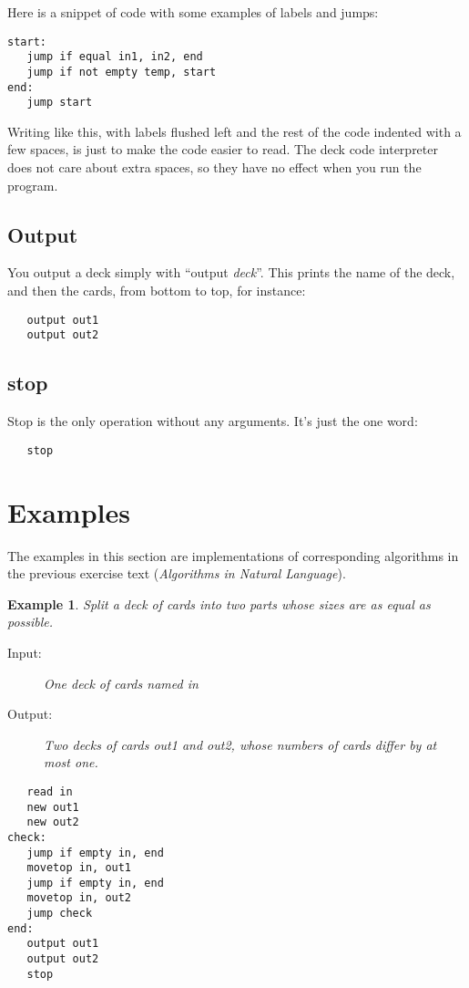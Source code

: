 \documentclass[a4paper,twoside]{tufte-handout}
\newtheorem{example}{Example}
\begin{document}
  
Here is a snippet of code with some examples of labels and jumps:
\begin{lstlisting}
start:
   jump if equal in1, in2, end
   jump if not empty temp, start
end:
   jump start
\end{lstlisting}

Writing like this, with labels flushed left and the rest of the code
indented with a few spaces, is just to make the code easier to
read. The deck code interpreter does not care about extra spaces, so
they have no effect when you run the program.

\subsection{Output}\label{sec-output}

You output a deck simply with ``output \emph{deck}''. This prints the
name of the deck, and then the cards, from bottom to top, for
instance:
\begin{lstlisting}
   output out1
   output out2
\end{lstlisting}

\subsection{stop}\label{sec-stop}

Stop is the only operation without any arguments. It's just the one word:
\begin{lstlisting}
   stop
\end{lstlisting}

\section{Examples}\label{sec-examp}

The examples in this section are implementations of corresponding
algorithms in the previous exercise text (\emph{Algorithms in Natural
  Language}).

\begin{example}
  Split a deck of cards into two parts whose sizes are as equal as possible.
  \begin{description}
  \item[Input:] One deck of cards named \emph{in}
  \item[Output:] Two decks of cards \emph{out1} and \emph{out2},
    whose numbers of cards differ by at most one.
  \end{description}
\begin{lstlisting}
   read in
   new out1
   new out2
check:
   jump if empty in, end
   movetop in, out1
   jump if empty in, end
   movetop in, out2
   jump check
end:
   output out1
   output out2
   stop
\end{lstlisting}
\end{example}
\end{document}
